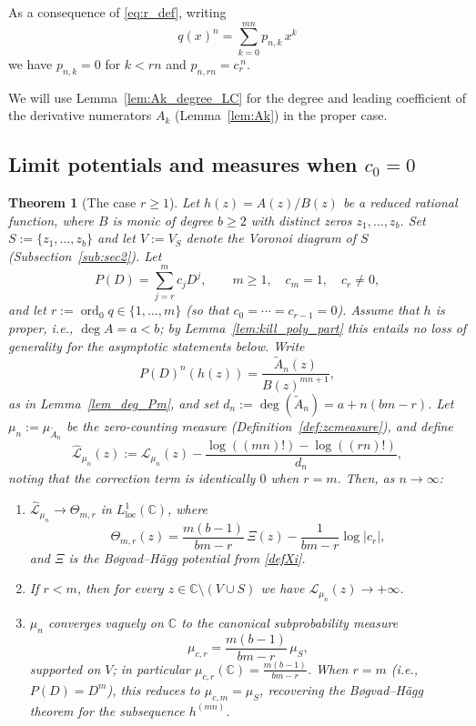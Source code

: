 \documentclass[12pt]{article}
\theoremstyle{plain}
\newtheorem{theorem}{Theorem}
\theoremstyle{definition}
\begin{document}
As a consequence of \eqref{eq:r_def}, writing
$$q(x)^n=\sum_{k=0}^{mn}p_{n,k}\,x^k$$
we have $p_{n,k}=0$ for $k<rn$ and $p_{n,rn}=c_r^{\,n}$.

We will use Lemma~\ref{lem:Ak_degree_LC} for the degree and leading coefficient of the derivative numerators $A_k$ (Lemma~\ref{lem:Ak}) in the proper case.

\subsection{Limit potentials and measures when $c_0=0$}

\begin{theorem}[The case $r\ge 1$]\label{thr:r_positive}
Let $h(z)=A(z)/B(z)$ be a reduced rational function, where $B$ is monic of degree $b\ge 2$ with distinct zeros $z_1,\dots,z_b$.
Set $S:=\{z_1,\dots,z_b\}$ and let $V:=V_S$ denote the Voronoi diagram of $S$ (Subsection~\ref{sub:sec2}).
Let
$$P(D)=\sum_{j=r}^{m}c_jD^j,\qquad m\ge1,\quad c_m=1,\quad c_r\neq 0,$$
and let $r:=\operatorname{ord}_0 q\in\{1,\dots,m\}$ (so that $c_0=\cdots=c_{r-1}=0$).
Assume that $h$ is proper, i.e., $\deg A=a<b$; by Lemma~\ref{lem:kill_poly_part} this entails no loss of generality for the asymptotic statements below.
Write
$$P(D)^n(h(z))=\frac{\widetilde A_n(z)}{B(z)^{mn+1}},$$
as in Lemma~\ref{lem_deg_Pm}, and set $d_n:=\deg(\widetilde A_n)=a+n(bm-r)$.
Let $\mu_n:=\mu_{\widetilde A_n}$ be the zero-counting measure (Definition~\ref{def:zcmeasure}), and define
$$\widehat{\mathcal L}_{\mu_n}(z):=\mathcal L_{\mu_n}(z)-\frac{\log((mn)!)-\log((rn)!)}{d_n},$$
noting that the correction term is identically $0$ when $r=m$.
Then, as $n\to\infty$:
\begin{enumerate}
\item[(1)] $\widehat{\mathcal L}_{\mu_n}\to \Theta_{m,r}$ in $L^1_{\mathrm{loc}}(\mathbb C)$, where
$$\Theta_{m,r}(z)=\frac{m(b-1)}{bm-r}\,\Xi(z)-\frac{1}{bm-r}\log|c_r|,$$
and $\Xi$ is the B\o gvad--H\"agg potential from \eqref{defXi}.
\item[(2)] If $r<m$, then for every $z\in\mathbb C\setminus(V\cup S)$ we have $\mathcal L_{\mu_n}(z)\to+\infty$.
\item[(3)] $\mu_n$ converges vaguely on $\mathbb C$ to the canonical subprobability measure
$$\mu_{c,r}=\frac{m(b-1)}{bm-r}\,\mu_S,$$
supported on $V$; in particular $\mu_{c,r}(\mathbb C)=\frac{m(b-1)}{bm-r}$.
When $r=m$ (i.e., $P(D)=D^m$), this reduces to $\mu_{c,m}=\mu_S$, recovering the B\o gvad--H\"agg theorem for the subsequence $h^{(mn)}$.
\end{enumerate}
\end{theorem}
\end{document}
